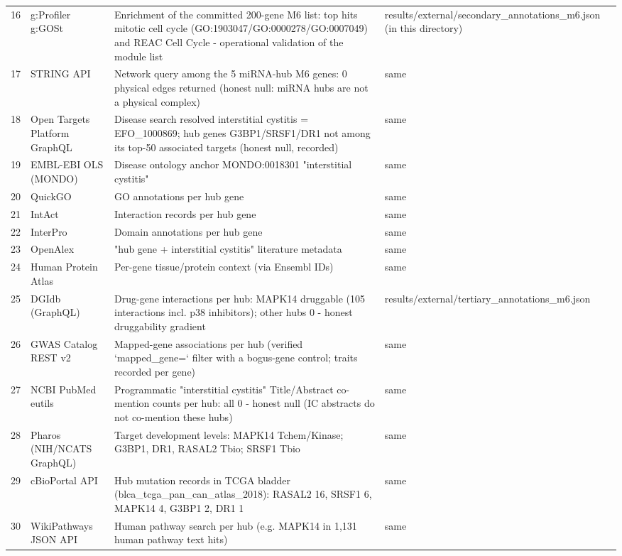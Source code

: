 \begin{longtable}{r p{} p{} p{}}
16 & g:Profiler g:GOSt & Enrichment of the committed 200-gene M6 list: top hits mitotic cell cycle (GO:1903047/GO:0000278/GO:0007049) and REAC Cell Cycle - operational validation of the module list & results/external/secondary\_annotations\_m6.json (in this directory) \\
17 & STRING API & Network query among the 5 miRNA-hub M6 genes: 0 physical edges returned (honest null: miRNA hubs are not a physical complex) & same \\
18 & Open Targets Platform GraphQL & Disease search resolved interstitial cystitis = EFO\_1000869; hub genes G3BP1/SRSF1/DR1 not among its top-50 associated targets (honest null, recorded) & same \\
19 & EMBL-EBI OLS (MONDO) & Disease ontology anchor MONDO:0018301 "interstitial cystitis" & same \\
20 & QuickGO & GO annotations per hub gene & same \\
21 & IntAct & Interaction records per hub gene & same \\
22 & InterPro & Domain annotations per hub gene & same \\
23 & OpenAlex & "hub gene + interstitial cystitis" literature metadata & same \\
24 & Human Protein Atlas & Per-gene tissue/protein context (via Ensembl IDs) & same \\
25 & DGIdb (GraphQL) & Drug-gene interactions per hub: MAPK14 druggable (105 interactions incl. p38 inhibitors); other hubs 0 - honest druggability gradient & results/external/tertiary\_annotations\_m6.json \\
26 & GWAS Catalog REST v2 & Mapped-gene associations per hub (verified `mapped\_gene=` filter with a bogus-gene control; traits recorded per gene) & same \\
27 & NCBI PubMed eutils & Programmatic "interstitial cystitis" Title/Abstract co-mention counts per hub: all 0 - honest null (IC abstracts do not co-mention these hubs) & same \\
28 & Pharos (NIH/NCATS GraphQL) & Target development levels: MAPK14 Tchem/Kinase; G3BP1, DR1, RASAL2 Tbio; SRSF1 Tbio & same \\
29 & cBioPortal API & Hub mutation records in TCGA bladder (blca\_tcga\_pan\_can\_atlas\_2018): RASAL2 16, SRSF1 6, MAPK14 4, G3BP1 2, DR1 1 & same \\
30 & WikiPathways JSON API & Human pathway search per hub (e.g. MAPK14 in 1,131 human pathway text hits) & same \\

\end{longtable}
